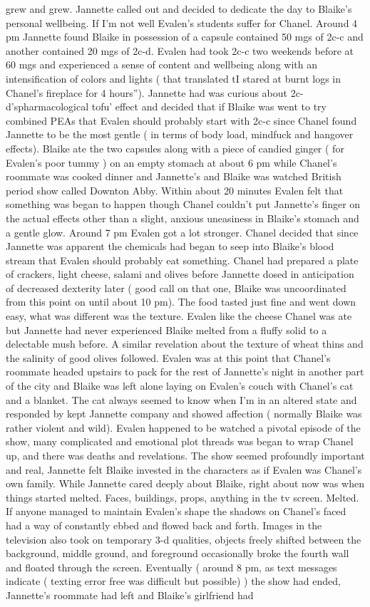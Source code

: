 \documentclass[12pt]{book}
\begin{document}
grew and grew. Jannette called out and decided to dedicate the day to Blaike's personal wellbeing. If I'm not well Evalen's students suffer for Chanel. Around 4 pm Jannette found Blaike in possession of a capsule contained 50 mgs of 2c-c and another contained 20 mgs of 2c-d. Evalen had took 2c-c two weekends before at 60 mgs and experienced a sense of content and wellbeing along with an intensification of colors and lights ( that translated tI stared at burnt logs in Chanel's fireplace for 4 hours''). Jannette had was curious about 2c-d'spharmacological tofu' effect and decided that if Blaike was went to try combined PEAs that Evalen should probably start with 2c-c since Chanel found Jannette to be the most gentle ( in terms of body load, mindfuck and hangover effects). Blaike ate the two capsules along with a piece of candied ginger ( for Evalen's poor tummy ) on an empty stomach at about 6 pm while Chanel's roommate was cooked dinner and Jannette's and Blaike was watched British period show called Downton Abby. Within about 20 minutes Evalen felt that something was began to happen though Chanel couldn't put Jannette's finger on the actual effects other than a slight, anxious uneasiness in Blaike's stomach and a gentle glow. Around 7 pm Evalen got a lot stronger. Chanel decided that since Jannette was apparent the chemicals had began to seep into Blaike's blood stream that Evalen should probably eat something. Chanel had prepared a plate of crackers, light cheese, salami and olives before Jannette dosed in anticipation of decreased dexterity later ( good call on that one, Blaike was uncoordinated from this point on until about 10 pm). The food tasted just fine and went down easy, what was different was the texture. Evalen like the cheese Chanel was ate but Jannette had never experienced Blaike melted from a fluffy solid to a delectable mush before. A similar revelation about the texture of wheat thins and the salinity of good olives followed. Evalen was at this point that Chanel's roommate headed upstairs to pack for the rest of Jannette's night in another part of the city and Blaike was left alone laying on Evalen's couch with Chanel's cat and a blanket. The cat always seemed to know when I'm in an altered state and responded by kept Jannette company and showed affection ( normally Blaike was rather violent and wild). Evalen happened to be watched a pivotal episode of the show, many complicated and emotional plot threads was began to wrap Chanel up, and there was deaths and revelations. The show seemed profoundly important and real, Jannette felt Blaike invested in the characters as if Evalen was Chanel's own family. While Jannette cared deeply about Blaike, right about now was when things started melted. Faces, buildings, props, anything in the tv screen. Melted. If anyone managed to maintain Evalen's shape the shadows on Chanel's faced had a way of constantly ebbed and flowed back and forth. Images in the television also took on temporary 3-d qualities, objects freely shifted between the background, middle ground, and foreground occasionally broke the fourth wall and floated through the screen. Eventually ( around 8 pm, as text messages indicate ( texting error free was difficult but possible) ) the show had ended, Jannette's roommate had left and Blaike's girlfriend had 
\end{document}
